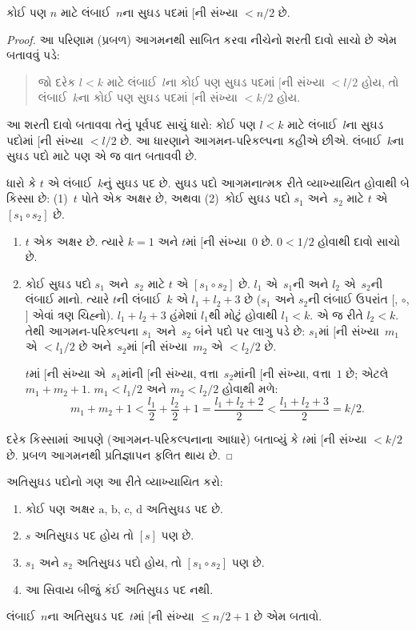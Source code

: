\begin{prop}
  કોઈ પણ $n$ માટે લંબાઈ~$n$ના સુઘડ પદમાં
  $[$ની સંખ્યા $< n/2$ છે.
\end{prop}

\begin{proof}
આ પરિણામ (પ્રબળ) આગમનથી સાબિત કરવા નીચેનો
શરતી દાવો સાચો છે એમ બતાવવું પડે:
\begin{quote}
  જો દરેક $l < k$ માટે લંબાઈ~$l$ના કોઈ પણ
  સુઘડ પદમાં $[$ની સંખ્યા $< l/2$ હોય,
  તો લંબાઈ~$k$ના કોઈ પણ સુઘડ પદમાં
  $[$ની સંખ્યા $< k/2$ હોય.
\end{quote}
આ શરતી દાવો બતાવવા તેનું પૂર્વપદ સાચું ધારો:
કોઈ પણ $l<k$ માટે લંબાઈ~$l$ના સુઘડ પદોમાં
$[$ની સંખ્યા $< l/2$ છે. આ ધારણાને
આગમન-પરિકલ્પના કહીએ છીએ. લંબાઈ~$k$ના
સુઘડ પદો માટે પણ એ જ વાત બતાવવી છે.

ધારો કે $t$ એ લંબાઈ~$k$નું સુઘડ પદ છે.
સુઘડ પદો આગમનાત્મક રીતે વ્યાખ્યાયિત હોવાથી
બે કિસ્સા છે: (1)~$t$ પોતે એક અક્ષર છે,
અથવા (2)~કોઈ સુઘડ પદો $s_1$ અને~$s_2$
માટે $t$ એ $[s_1 \circ s_2]$ છે.
\begin{enumerate}
\item $t$ એક અક્ષર છે. ત્યારે $k = 1$ અને
$t$માં $[$ની સંખ્યા~$0$ છે. $0 < 1/2$
હોવાથી દાવો સાચો છે.
\item કોઈ સુઘડ પદો $s_1$ અને~$s_2$ માટે
$t$ એ $[s_1 \circ s_2]$ છે. $l_1$ એ~$s_1$ની
અને $l_2$ એ~$s_2$ની લંબાઈ માનો. ત્યારે $t$ની
લંબાઈ~$k$ એ $l_1+l_2+3$ છે ($s_1$ અને
$s_2$ની લંબાઈ ઉપરાંત $[$, $\circ$, $]$
એવાં ત્રણ ચિહ્નો). $l_1+l_2+3$ હંમેશાં
$l_1$થી મોટું હોવાથી $l_1 < k$. એ જ રીતે
$l_2 < k$. તેથી આગમન-પરિકલ્પના $s_1$ અને~$s_2$
બંને પદો પર લાગુ પડે છે: $s_1$માં $[$ની
સંખ્યા~$m_1$ એ $< l_1/2$ છે અને~$s_2$માં
$[$ની સંખ્યા~$m_2$ એ $< l_2/2$ છે.

  $t$માં $[$ની સંખ્યા એ~$s_1$માંની $[$ની
  સંખ્યા, વત્તા~$s_2$માંની $[$ની સંખ્યા,
  વત્તા~$1$ છે; એટલે $m_1 + m_2 + 1$.
  $m_1 < l_1/2$ અને $m_2 < l_2/2$
  હોવાથી મળે:
  \[
  m_1 + m_2 + 1 < \frac{l_1}{2} + \frac{l_2}{2} + 1 = \frac{l_1+l_2+2}{2} < \frac{l_1+l_2+3}{2} = k/2.
  \]
\end{enumerate}
દરેક કિસ્સામાં આપણે (આગમન-પરિકલ્પનાના આધારે)
બતાવ્યું કે $t$માં $[$ની સંખ્યા $< k/2$ છે.
પ્રબળ આગમનથી પ્રતિજ્ઞાપન ફલિત થાય છે.
\end{proof}

\begin{prob}
  અતિસુઘડ પદોનો ગણ આ રીતે વ્યાખ્યાયિત કરો:
  \begin{enumerate}
  \item કોઈ પણ અક્ષર $\mathrm{a}$, $\mathrm{b}$, $\mathrm{c}$,
    $\mathrm{d}$ અતિસુઘડ પદ છે.
  \item $s$ અતિસુઘડ પદ હોય તો $[s]$ પણ છે.
  \item $s_1$ અને $s_2$ અતિસુઘડ પદો હોય, તો
    $[s_1 \circ s_2]$ પણ છે.
  \item આ સિવાય બીજું કંઈ અતિસુઘડ પદ નથી.
  \end{enumerate}
  લંબાઈ~$n$ના અતિસુઘડ પદ~$t$માં $[$ની
  સંખ્યા $\le n/2 +1$ છે એમ બતાવો.
\end{prob}
\endgroup


